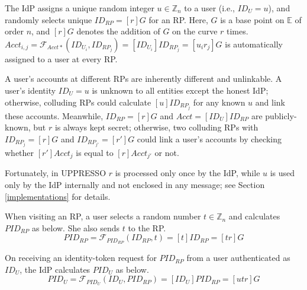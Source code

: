 The IdP assigns a unique random integer $u \in \mathbb{Z}_n$ to a user (i.e., $ID_U = u$),
 and randomly selects unique $ID_{RP} = [r]G$ for an RP. %
Here, $G$ is a base point on $\mathbb{E}$ of order $n$, and $[r]G$ denotes the addition of $G$ on the curve $r$ times.
$Acct_{i,j} = \mathcal{F}_{Acct\ast}(ID_{U_i}, ID_{RP_j})= [ID_{U_i}]ID_{RP_j} =[u_ir_j]G$ is automatically assigned to a user at every RP.

A user's accounts at different RPs are inherently different and unlinkable.
A user's identity $ID_U = u$ is unknown to all entities except the honest IdP; otherwise, colluding RPs could calculate $[u]ID_{RP_j}$ for any known $u$ and link these accounts.
Meanwhile, $ID_{RP} = [r]G$ and $Acct = [ID_U]ID_{RP}$ are publicly-known,
 but $r$ is always kept secret;
otherwise, two colluding RPs with $ID_{RP_j} = [r]G$ and $ID_{RP_{j'}} = [r']G$ could link a user's accounts by checking whether $[r']Acct_j$ is equal to $[r]Acct_{j'}$ or not.

Fortunately, in UPPRESSO $r$ is processed only once by the IdP,
    while $u$ is used only by the IdP internally and
 not enclosed in any message; see Section \ref{implementations} for details.


 When visiting an RP,
a user selects a random number $t \in \mathbb{Z}_n$
    and calculates $PID_{RP}$ as below. She also sends $t$ to the RP.
\begin{equation}
PID_{RP} = \mathcal{F}_{PID_{RP}}(ID_{RP},t) = [t]{ID_{RP}} = [tr]G
\label{equ:PIDRP}
\end{equation}



On receiving an identity-token request for $PID_{RP}$ from a user authenticated as $ID_U$, the IdP calculates $PID_{U}$ as below.
\begin{equation}
PID_{U} = \mathcal{F}_{PID_U}(ID_U, PID_{RP}) =
  [{ID_U}]{PID_{RP}} = [utr]G
 \label{equ:PIDU}
\end{equation}


